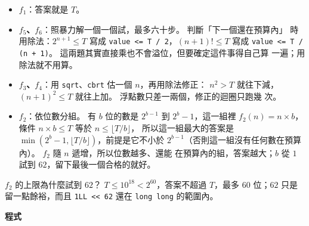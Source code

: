 \begin{itemize}
\item \textbf{$f_1$}：答案就是 $T$。
\item \textbf{$f_5$、$f_6$}：照暴力解一個一個試，最多六十步。 判斷「下一個還在預算內」
時用除法：$2^{n+1} \le T$ 寫成 \texttt{value <= T / 2}，$(n+1)! \le T$ 寫成
\texttt{value <= T / (n + 1)}。 這兩題其實直接乘也不會溢位，但要確定這件事得自己算
一遍；用除法就不用算。
\item \textbf{$f_3$、$f_4$}：用 \texttt{sqrt}、\texttt{cbrt} 估一個 $n$，再用除法修正：
$n^2 > T$ 就往下減，$(n+1)^2 \le T$ 就往上加。 浮點數只差一兩個，修正的迴圈只跑幾
次。
\item \textbf{$f_2$}：依位數分組。 有 $b$ 位的數是 $2^{b-1}$ 到 $2^b - 1$，這一組裡
$f_2(n) = n \times b$，條件 $n \times b \le T$ 等於 $n \le \lfloor T / b \rfloor$，
所以這一組最大的答案是 $\min(2^b - 1, \lfloor T / b \rfloor)$，前提是它不小於
$2^{b-1}$（否則這一組沒有任何數在預算內）。 $f_2$ 隨 $n$ 遞增，所以位數越多、還能
在預算內的組，答案越大；$b$ 從 $1$ 試到 $62$，留下最後一個合格的就好。
\end{itemize}

$f_2$ 的上限為什麼試到 $62$？ $T \le 10^{18} < 2^{60}$，答案不超過 $T$，最多 $60$
位；$62$ 只是留一點餘裕，而且 \texttt{1LL << 62} 還在 \texttt{long long} 的範圍內。

\textbf{程式}

